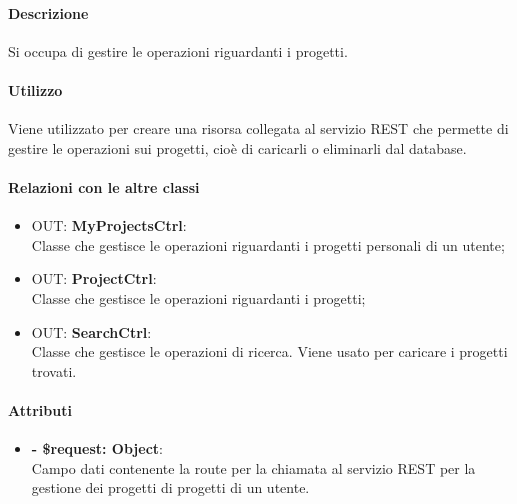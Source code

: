 		\paragraph{Descrizione}
		Si occupa di gestire le operazioni riguardanti i progetti.
		
		\paragraph{Utilizzo}
		Viene utilizzato per creare una risorsa collegata al servizio \gls{REST} che permette di gestire le operazioni sui progetti, cioè di caricarli o eliminarli dal \gls{database}.
		
		\paragraph{Relazioni con le altre classi}
		\begin{itemize}
			\item OUT: \textbf{MyProjectsCtrl}:\\
			Classe che gestisce le operazioni riguardanti i progetti personali di un utente;
			\item OUT: \textbf{ProjectCtrl}:\\
			Classe che gestisce le operazioni riguardanti i progetti;
			\item OUT: \textbf{SearchCtrl}:\\
			Classe che gestisce le operazioni di ricerca. Viene usato per caricare i progetti trovati.
		\end{itemize}
		
		\paragraph{Attributi}
		\begin{itemize}
			\item \textbf{- \$request: Object}:\\
			Campo dati contenente la route per la chiamata al servizio \gls{REST} per la gestione dei progetti di progetti di un utente.
		\end{itemize}	
		
